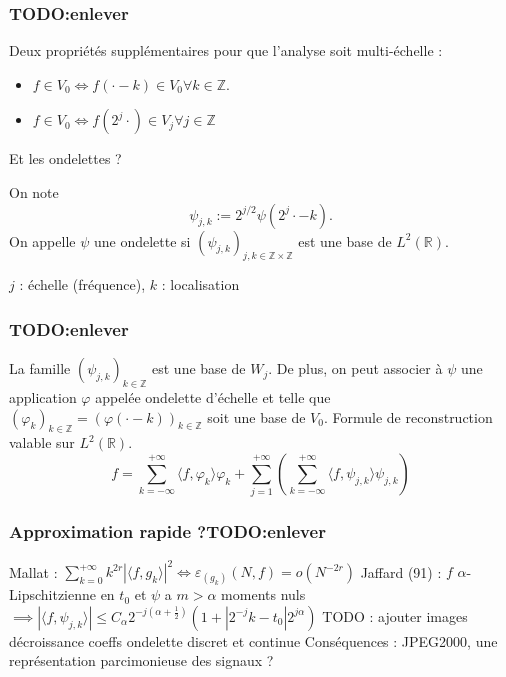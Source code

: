 \documentclass{beamer}
\begin{document}
	\begin{frame}
		\frametitle{TODO:enlever}
		Deux propriétés supplémentaires pour que l'analyse soit multi-échelle :
		\begin{itemize}
			\item $f \in V_0 \iff f(\cdot -k) \in V_0 \forall k \in \mathbb{Z}$.
			\item $f \in V_0 \iff f(2^j \cdot) \in V_j \forall j \in \mathbb{Z}$
		\end{itemize}
		Et les ondelettes ?
		\begin{definition}
			On note 
			\begin{equation}
				\psi_{j,k} := 2^{j/2}\psi(2^j\cdot -k).
			\end{equation}
			On appelle $\psi$ une ondelette si $(\psi_{j,k})_{j,k\in\mathbb{Z}\times\mathbb{Z}}$ est une base de $L^2(\mathbb{R})$. 
		\end{definition}
		$j$ : échelle (fréquence), $k$ : localisation

	\end{frame}

	\begin{frame}
		\frametitle{TODO:enlever}
		La famille $(\psi_{j,k})_{k\in\mathbb{Z}}$ est une base de $W_j$. De plus, on peut associer à $\psi$ une application $\varphi$ appelée ondelette d'échelle et telle que 
		$(\varphi_k)_{k\in\mathbb{Z}} = (\varphi(\cdot -k))_{k\in\mathbb{Z}}$ soit une base de $V_0$.
		\newline
		Formule de reconstruction valable sur $L^2(\mathbb{R})$.
		\begin{equation}
			f =\sum_{k=-\infty}^{+\infty} \langle f, \varphi_k \rangle\varphi_k + \sum_{j=1}^{+\infty} \left(\sum_{k=-\infty}^{+\infty} \langle f, \psi_{j,k} \rangle \psi_{j,k}\right)
		\end{equation}
	\end{frame}
	\begin{frame}
		\frametitle{Approximation rapide ?TODO:enlever}
		Mallat : $\sum_{k=0}^{+\infty} k^{2r}|\langle f, g_k \rangle|^2 \iff \varepsilon_{(g_k)}(N, f) = o(N^{-2r})$\newline
		Jaffard (91) : $f$ $\alpha$-Lipschitzienne en $t_0$ et $\psi$ a $m>\alpha$ moments nuls $\implies |\langle f, \psi_{j,k} \rangle| \leq C_\alpha 2^{-j(\alpha + \frac{1}{2})}(1+|2^{-j}k -t_0|2^{j\alpha})$
		TODO : ajouter images décroissance coeffs ondelette discret et continue
		Conséquences : JPEG2000, une représentation parcimonieuse des signaux ?
	\end{frame}
\end{document}
